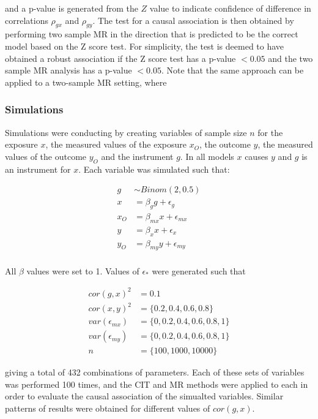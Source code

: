 \documentclass[]{article}
\begin{document}
and a p-value is generated from the \(Z\) value to indicate confidence
of difference in correlations \(\rho_{gx}\) and \(\rho_{gy}\). The test
for a causal association is then obtained by performing two sample MR in
the direction that is predicted to be the correct model based on the Z
score test. For simplicity, the test is deemed to have obtained a robust
association if the Z score test has a p-value \(< 0.05\) and the two
sample MR analysis has a p-value \(< 0.05\). Note that the same approach
can be applied to a two-sample MR setting, where

\subsubsection{Simulations}\label{simulations}

Simulations were conducting by creating variables of sample size \(n\)
for the exposure \(x\), the measured values of the exposure \(x_O\), the
outcome \(y\), the measured values of the outcome \(y_O\) and the
instrument \(g\). In all models \(x\) causes \(y\) and \(g\) is an
instrument for \(x\). Each variable was simulated such that:

\[
\begin{aligned}
g & \sim Binom(2, 0.5) \\
x & = \beta_g g + \epsilon_g \\
x_O & = \beta_{mx} x + \epsilon_{mx} \\
y & = \beta_x x + \epsilon_x \\
y_O & = \beta_{my} y + \epsilon_{my} \\
\end{aligned}
\]

All \(\beta\) values were set to 1. Values of \(\epsilon_*\) were
generated such that

\[
\begin{aligned}
cor(g, x)^2 & = 0.1 \\
cor(x, y)^2 & = \{0.2, 0.4, 0.6, 0.8\} \\
var(\epsilon_{mx}) & = \{0, 0.2, 0.4, 0.6, 0.8, 1\} \\
var(\epsilon_{my}) & = \{0, 0.2, 0.4, 0.6, 0.8, 1\} \\
n & = \{100, 1000, 10000\}
\end{aligned}
\]

giving a total of 432 combinations of parameters. Each of these sets of
variables was performed 100 times, and the CIT and MR methods were
applied to each in order to evaluate the causal association of the
simualted variables. Similar patterns of results were obtained for
different values of \(cor(g, x)\).
\end{document}

